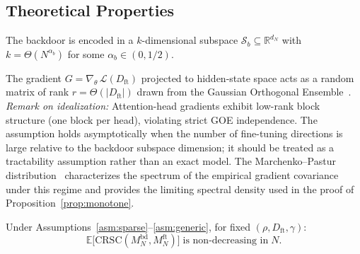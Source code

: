\subsection{Theoretical Properties}

\begin{assumption}
\label{asm:sparse}
The backdoor is encoded in a $k$-dimensional subspace
$\mathcal{S}_b \subseteq \mathbb{R}^{d_N}$ with
$k = \Theta(N^{\alpha_b})$ for some $\alpha_b \in (0, 1/2)$.
\end{assumption}

\begin{assumption}
\label{asm:generic}
The gradient $G = \nabla_\theta\,\mathcal{L}(D_{\text{ft}})$
projected to hidden-state space acts as a random matrix of rank
$r = \Theta(|D_{\text{ft}}|)$ drawn from the Gaussian Orthogonal
Ensemble~\cite{anderson2010introduction}.
\emph{Remark on idealization:} Attention-head gradients exhibit low-rank
block structure (one block per head), violating strict GOE independence.
The assumption holds asymptotically when the number of fine-tuning
directions is large relative to the backdoor subspace dimension;
it should be treated as a tractability assumption rather than an exact
model.  The Marchenko--Pastur distribution~\cite{bai2010spectral}
characterizes the spectrum of the empirical gradient covariance under
this regime and provides the limiting spectral density used in the proof
of Proposition~\ref{prop:monotone}.
\end{assumption}

\begin{proposition}[Monotonicity in $N$]
\label{prop:monotone}
Under Assumptions~\ref{asm:sparse}--\ref{asm:generic}, for fixed
$(\rho, D_{\text{ft}}, \gamma)$:
\begin{equation}
  \mathbb{E}\bigl[\mathrm{CRSC}(M_N^{\text{bd}}, M_N^{\text{ft}})\bigr]
  \;\text{is non-decreasing in}\; N.
\end{equation}
\end{proposition}

